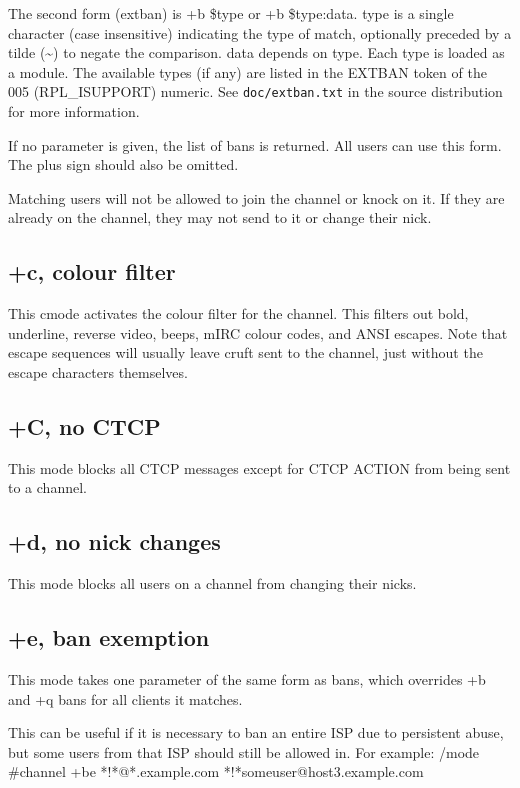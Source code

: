 	The second form (extban) is +b \$type or +b \$type:data. type is a
	single character (case insensitive) indicating the type of match,
	optionally preceded by a tilde (\textasciitilde{}) to negate the
	comparison. data depends on type. Each type is loaded as a module. The
	available types (if any) are listed in the EXTBAN token of the 005
	(RPL\_ISUPPORT) numeric. See \nolinkurl{doc/extban.txt} in the source
	distribution for more information.

	If no parameter is given, the list of bans is returned. All users can
	use this form. The plus sign should also be omitted.

	Matching users will not be allowed to join the channel or knock on it.
	If they are already on the channel, they may not send to it or change
	their nick.


\subsection{+c, colour filter}
	This cmode activates the colour filter for the channel. This filters
	out bold, underline, reverse video, beeps, mIRC colour codes, and ANSI
	escapes. Note that escape sequences will usually leave cruft sent to
	the channel, just without the escape characters themselves.


\subsection{+C, no CTCP}
	This mode blocks all CTCP messages except for CTCP ACTION from being
	sent to a channel.


\subsection{+d, no nick changes}
	This mode blocks all users on a channel from changing their nicks.

\subsection{+e, ban exemption}
	This mode takes one parameter of the same form as bans, which overrides
	+b and +q bans for all clients it matches.

	This can be useful if it is necessary to ban an entire ISP due to
	persistent abuse, but some users from that ISP should still be allowed
	in. For example: /mode \#channel +be *!*@*.example.com
	*!*someuser@host3.example.com

